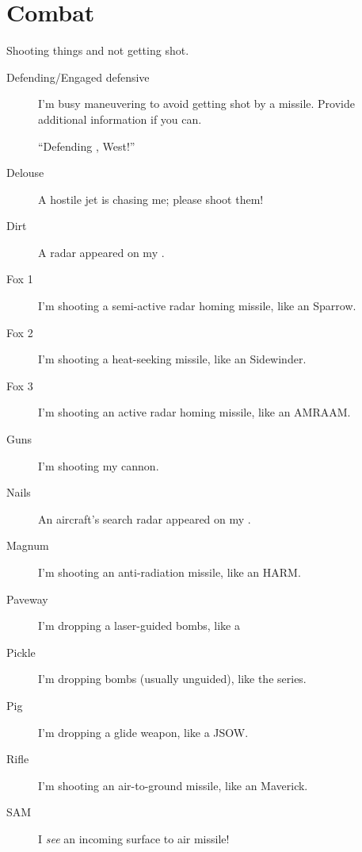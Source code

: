 \section{Combat}

Shooting things and not getting shot.
\begin{description}

\item[Defending/Engaged defensive] I'm busy maneuvering to avoid getting shot by
    a missile. Provide additional information if you can.

    ``Defending , West!''

\item[Delouse] A hostile jet is chasing me; please shoot them!

\item[Dirt] A  radar appeared on my .

\item[Fox 1] I'm shooting a semi-active radar homing 
    missile, like an  Sparrow.
\item[Fox 2] I'm shooting a heat-seeking missile, like an
     Sidewinder.
\item[Fox 3] I'm shooting an active radar homing  missile,
    like an  AMRAAM.

\item[Guns] I'm shooting my cannon.

\item[Nails] An aircraft's search radar appeared on my .

\item[Magnum] I'm shooting an anti-radiation missile,
    like an  HARM.

\item[Paveway] I'm dropping a laser-guided bombs,
    like a 

\item[Pickle] I'm dropping bombs (usually unguided),
    like the  series.

\item[Pig] I'm dropping a glide weapon, like a  JSOW.

\item[Rifle] I'm shooting an air-to-ground missile,
    like an  Maverick.

\item[SAM] I \emph{see} an incoming surface to air missile!


\end{description}
